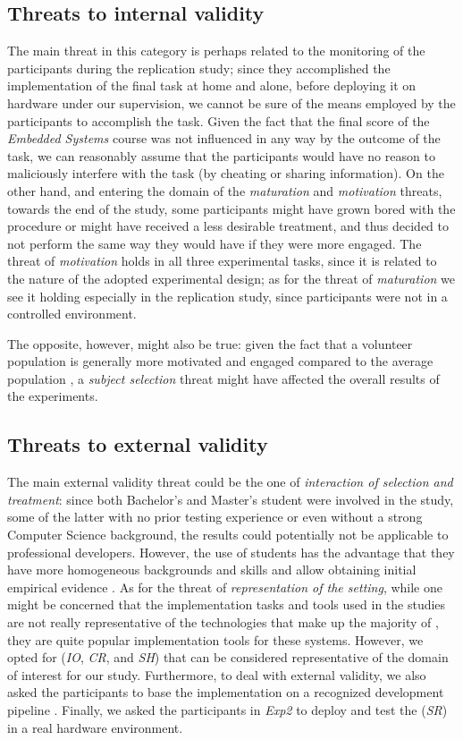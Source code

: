 \subsection{Threats to internal validity}
The main threat in this category is perhaps related to the monitoring of the participants during the replication study; since they accomplished the implementation of the final task at home and alone, before deploying it on hardware under our supervision, we cannot be sure of the means employed by the participants to accomplish the task. Given the fact that the final score of the \textit{Embedded Systems} course was not influenced in any way by the outcome of the task, we can reasonably assume that the participants would have no reason to maliciously interfere with the task (\ie by cheating or sharing information). On the other hand, and entering the domain of the \textit{maturation} and \textit{motivation} threats, towards the end of the study, some participants might have grown bored with the procedure or might have received a less desirable treatment, and thus decided to not perform the same way they would have if they were more engaged. The threat of \textit{motivation} holds in all three experimental tasks, since it is related to the nature of the adopted experimental design; as for the threat of \textit{maturation} we see it holding especially in the replication study, since participants were not in a controlled environment.

The opposite, however, might also be true: given the fact that a volunteer population is generally more motivated and engaged compared to the average population \cite{DBLP:books/sp/WohlinRHOR00}, a \textit{subject selection} threat might have affected the overall results of the experiments.

\subsection{Threats to external validity}
The main external validity threat could be the one of \textit{interaction of selection and treatment}: since both Bachelor's and Master's student were involved in the study, some of the latter with no prior testing experience or even without a strong Computer Science background, the results could potentially not be applicable to professional developers. 
However, the use of students has the advantage that they have more homogeneous backgrounds and skills and allow obtaining initial empirical evidence \cite{DBLP:conf/metrics/CarverJMS03, DBLP:journals/ese/HostRW00}.
As for the threat of \textit{representation of the setting}, while one might be concerned that the implementation tasks and tools used in the studies are not really representative of the technologies that make up the majority of \ess, they are quite popular implementation tools for these systems. 
However, we opted for \ess (\ie \textit{IO}, \textit{CR}, and \textit{SH}) that can be considered representative of the domain of interest for our study. Furthermore, to deal with external validity, we also asked the participants to base the \ess implementation on a recognized development pipeline \cite{TDDEC}. Finally, we asked the participants in \textit{Exp2} to deploy and test the \es (\ie \textit{SR}) in a real hardware environment.

